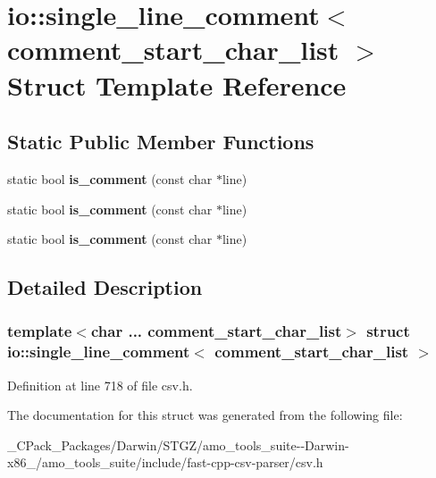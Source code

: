 \hypertarget{structio_1_1single__line__comment}{}\section{io\+:\+:single\+\_\+line\+\_\+comment$<$ comment\+\_\+start\+\_\+char\+\_\+list $>$ Struct Template Reference}
\label{structio_1_1single__line__comment}
\subsection*{Static Public Member Functions}
\begin{DoxyCompactItemize}
\item 
\mbox{\label{structio_1_1single__line__comment_ac4b029bb0efd251505f8e610cc308a92}} 
static bool {\bfseries is\+\_\+comment} (const char $\ast$line)
\item 
\mbox{\label{structio_1_1single__line__comment_ac4b029bb0efd251505f8e610cc308a92}} 
static bool {\bfseries is\+\_\+comment} (const char $\ast$line)
\item 
\mbox{\label{structio_1_1single__line__comment_ac4b029bb0efd251505f8e610cc308a92}} 
static bool {\bfseries is\+\_\+comment} (const char $\ast$line)
\end{DoxyCompactItemize}


\subsection{Detailed Description}
\subsubsection*{template$<$char ... comment\+\_\+start\+\_\+char\+\_\+list$>$\newline
struct io\+::single\+\_\+line\+\_\+comment$<$ comment\+\_\+start\+\_\+char\+\_\+list $>$}



Definition at line 718 of file csv.\+h.



The documentation for this struct was generated from the following file\+:\begin{DoxyCompactItemize}
\item 
\+\_\+\+C\+Pack\+\_\+\+Packages/\+Darwin/\+S\+T\+G\+Z/amo\+\_\+tools\+\_\+suite-\/-\/\+Darwin-\/x86\+\_/amo\+\_\+tools\+\_\+suite/include/fast-\/cpp-\/csv-\/parser/csv.\+h\end{DoxyCompactItemize}
